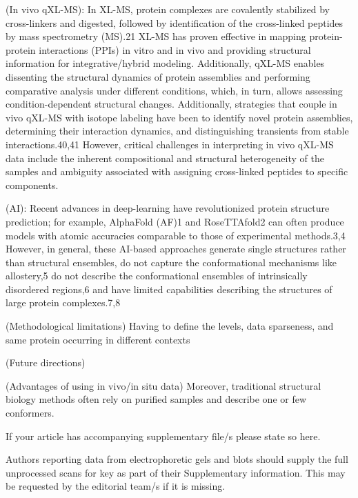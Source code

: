 \documentclass[pdflatex,sn-mathphys-num]{sn-jnl}%
\theoremstyle{thmstyleone}%
\theoremstyle{thmstyletwo}%
\theoremstyle{thmstylethree}%
\begin{document}
{(In vivo qXL-MS): In XL-MS, protein complexes are covalently stabilized by cross-linkers and digested, followed by identification of the cross-linked peptides by mass spectrometry (MS).21 XL-MS has proven effective in mapping protein-protein interactions (PPIs) in vitro and in vivo and providing structural information for integrative/hybrid modeling. Additionally, qXL-MS enables dissenting the structural dynamics of protein assemblies and performing comparative analysis under different conditions, which, in turn, allows assessing condition-dependent structural changes. Additionally, strategies that couple in vivo qXL-MS with isotope labeling have been to identify novel protein assemblies, determining their interaction dynamics, and distinguishing transients from stable interactions.40,41 However, critical challenges in interpreting in vivo qXL-MS data include the inherent compositional and structural heterogeneity of the samples and ambiguity associated with assigning cross-linked peptides to specific components.

(AI): Recent advances in deep-learning have revolutionized protein structure prediction; for example, AlphaFold (AF)1 and RoseTTAfold2 can often produce models with atomic accuracies comparable to those of experimental methods.3,4 However, in general, these AI-based approaches generate single structures rather than structural ensembles, do not capture the conformational mechanisms like allostery,5 do not describe the conformational ensembles of intrinsically disordered regions,6 and have limited capabilities describing the structures of large protein complexes.7,8 

(Methodological limitations) Having to define the levels, data sparseness, and same protein occurring in different contexts 

(Future directions)

(Advantages of using in vivo/in situ data) Moreover, traditional structural biology methods often rely on purified samples and describe one or few conformers. 


\backmatter


If your article has accompanying supplementary file/s please state so here. 

Authors reporting data from electrophoretic gels and blots should supply the full unprocessed scans for key as part of their Supplementary information. This may be requested by the editorial team/s if it is missing.

}
\end{document}
